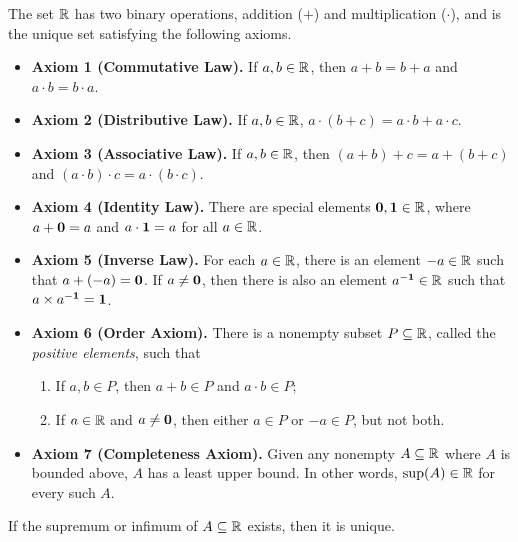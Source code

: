 \begin{proposition}[Axioms of $\RR$]
  The set $\RR$ has two binary operations, addition ($+$) and
  multiplication ($\cdot$), and is the unique set satisfying the
  following axioms.
  \begin{itemize}
    \item \textbf{Axiom 1 (Commutative Law).} If $a, b \in \mathbb R$, then
      $a + b = b + a$ and $a \cdot b = b \cdot a$.
    \item \textbf{Axiom 2 (Distributive Law).} If $a, b \in \mathbb R$, $a
      \cdot (b + c) = a \cdot b + a \cdot c$.
    \item \textbf{Axiom 3 (Associative Law).} If $a, b \in \mathbb R$, then
      $(a + b) + c = a + (b + c)$ and $(a \cdot b) \cdot c = a \cdot
      (b \cdot c)$.
    \item \textbf{Axiom 4 (Identity Law).} There are special elements
      $\textbf{0}, \textbf{1} \in \mathbb R$, where $a + \textbf{0} = a$ and $a \cdot \textbf{1}
      = a$ for all $a \in \mathbb R$.
    \item \textbf{Axiom 5 (Inverse Law).} For each $a \in \mathbb R$, there
      is an element $-a \in \mathbb R$ such that $a + (-a) = \textbf{0}$. If $a
      \neq \textbf{0}$, then there is also an element $a^{-\textbf{1}} \in \mathbb R$
      such that $a \times a^{-\textbf{1}} = \textbf{1}$.
    \item \textbf{Axiom 6 (Order Axiom).} There is a nonempty subset
      $P \subseteq \mathbb R$, called the \textit{positive elements}, such that
      \begin{enumerate}
        \item If $a, b \in P$, then $a + b \in P$ and $a \cdot b \in P$;
        \item If $a \in \mathbb R$ and $a \neq \textbf{0}$, then either $a \in
          P$ or $-a \in P$, but not both.
      \end{enumerate}
    \item \textbf{Axiom 7 (Completeness Axiom).} Given any nonempty
      $A \subseteq \mathbb R$ where $A$ is bounded above, $A$ has a least
      upper bound. In other words, $\sup(A) \in \mathbb R$ for every such $A$.
  \end{itemize}
\end{proposition}

\begin{proposition}
  If the supremum or infimum of $A \subseteq \mathbb R$ exists, then it is unique.
\end{proposition}

